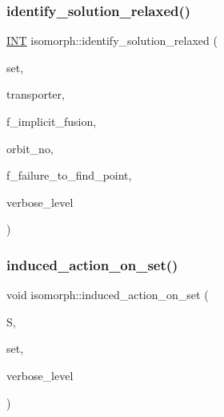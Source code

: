 \mbox{\label{classisomorph_a8c36c61c16700d8e570f71f84a4aabc6}} 
\subsubsection{\texorpdfstring{identify\+\_\+solution\+\_\+relaxed()}{identify\_solution\_relaxed()}}
{\footnotesize\ttfamily \mbox{\hyperlink{galois_8h_a09fddde158a3a20bd2dcadb609de11dc}{I\+NT}} isomorph\+::identify\+\_\+solution\+\_\+relaxed (\begin{DoxyParamCaption}\item[{\mbox{\hyperlink{galois_8h_a09fddde158a3a20bd2dcadb609de11dc}{I\+NT}} $\ast$}]{set,  }\item[{\mbox{\hyperlink{galois_8h_a09fddde158a3a20bd2dcadb609de11dc}{I\+NT}} $\ast$}]{transporter,  }\item[{\mbox{\hyperlink{galois_8h_a09fddde158a3a20bd2dcadb609de11dc}{I\+NT}}}]{f\+\_\+implicit\+\_\+fusion,  }\item[{\mbox{\hyperlink{galois_8h_a09fddde158a3a20bd2dcadb609de11dc}{I\+NT}} \&}]{orbit\+\_\+no,  }\item[{\mbox{\hyperlink{galois_8h_a09fddde158a3a20bd2dcadb609de11dc}{I\+NT}} \&}]{f\+\_\+failure\+\_\+to\+\_\+find\+\_\+point,  }\item[{\mbox{\hyperlink{galois_8h_a09fddde158a3a20bd2dcadb609de11dc}{I\+NT}}}]{verbose\+\_\+level }\end{DoxyParamCaption})}

\mbox{\label{classisomorph_a66a62f79a0f877b889ec5bd0c79392f1}} 
\subsubsection{\texorpdfstring{induced\+\_\+action\+\_\+on\+\_\+set()}{induced\_action\_on\_set()}}
{\footnotesize\ttfamily void isomorph\+::induced\+\_\+action\+\_\+on\+\_\+set (\begin{DoxyParamCaption}\item[{\mbox{\hyperlink{classsims}{sims}} $\ast$}]{S,  }\item[{\mbox{\hyperlink{galois_8h_a09fddde158a3a20bd2dcadb609de11dc}{I\+NT}} $\ast$}]{set,  }\item[{\mbox{\hyperlink{galois_8h_a09fddde158a3a20bd2dcadb609de11dc}{I\+NT}}}]{verbose\+\_\+level }\end{DoxyParamCaption})}

